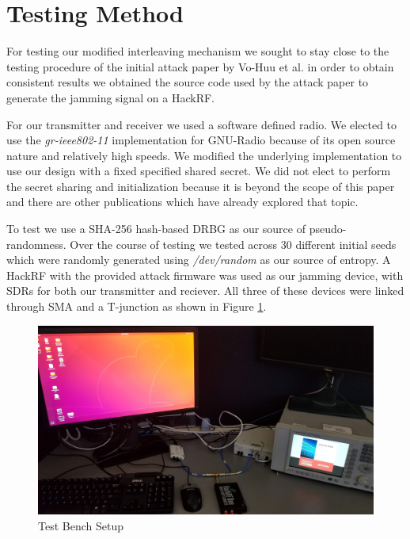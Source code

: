 \documentclass[sigconf, anonymous]{acmart}
\begin{document}
\section{Testing Method}
\label{sec:testing}

For testing our modified interleaving mechanism we sought to stay close to the testing procedure of the initial attack paper by Vo-Huu et al. in order to obtain consistent results we obtained the source code used by the attack paper to generate the jamming signal on a HackRF\cite{vo2016interleaving}.

For our transmitter and receiver we used a software defined radio. We elected to use the \textit{gr-ieee802-11} implementation for GNU-Radio because of its open source nature and relatively high speeds\cite{gr_ieee802}. We modified the underlying implementation to use our design with a fixed specified shared secret. We did not elect to perform the secret sharing and initialization because it is beyond the scope of this paper and there are other publications which have already explored that topic. 

To test we use a SHA-256 hash-based DRBG as our source of pseudo-randomness. Over the course of testing we tested across 30 different initial seeds which were randomly generated using \textit{/dev/random} as our source of entropy.  A HackRF with the provided attack firmware was used as our jamming device, with SDRs for both our transmitter and reciever. All three of these devices were linked through SMA and a T-junction as shown in Figure \ref{fig:test_setup}.%

\begin{figure}[ht]
    \centering
    \includegraphics[width=.75\linewidth]{test_bench.jpg}
    \caption{Test Bench Setup}
    \label{fig:test_setup}
\end{figure}

\end{document}
